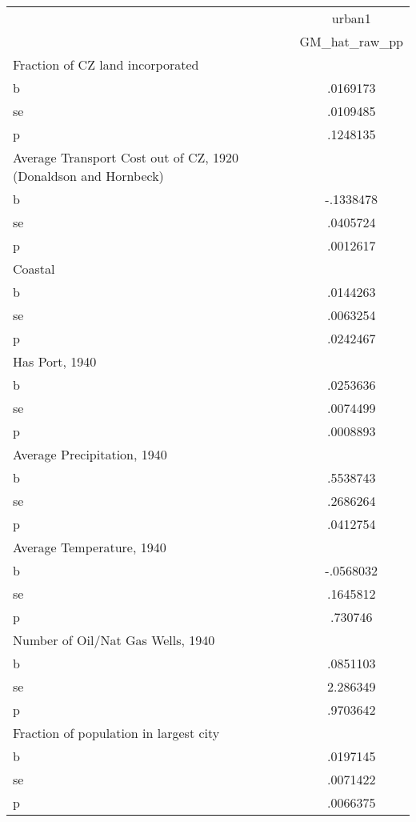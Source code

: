 \begin{tabular}{l*{1}{c}}
\toprule
                &   urban1\\
                &GM\_hat\_raw\_pp\\
\midrule
Fraction of CZ land incorporated&         \\
b               & .0169173\\
se              & .0109485\\
p               & .1248135\\
\midrule
Average Transport Cost out of CZ, 1920 (Donaldson and Hornbeck)&         \\
b               &-.1338478\\
se              & .0405724\\
p               & .0012617\\
\midrule
Coastal         &         \\
b               & .0144263\\
se              & .0063254\\
p               & .0242467\\
\midrule
Has Port, 1940  &         \\
b               & .0253636\\
se              & .0074499\\
p               & .0008893\\
\midrule
Average Precipitation, 1940&         \\
b               & .5538743\\
se              & .2686264\\
p               & .0412754\\
\midrule
Average Temperature, 1940&         \\
b               &-.0568032\\
se              & .1645812\\
p               &  .730746\\
\midrule
Number of Oil/Nat Gas Wells, 1940&         \\
b               & .0851103\\
se              & 2.286349\\
p               & .9703642\\
\midrule
Fraction of population in largest city&         \\
b               & .0197145\\
se              & .0071422\\
p               & .0066375\\

\end{tabular}
